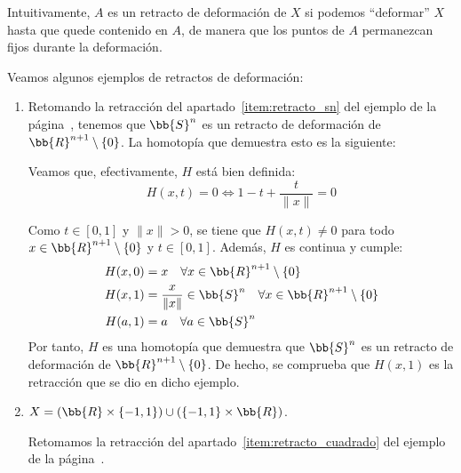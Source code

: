 Intuitivamente, $A$ es un retracto de deformación de $X$ si podemos ``deformar'' $X$ hasta que quede contenido en $A$, de manera que los puntos de $A$ permanezcan fijos durante la deformación.

\begin{ejemplo}\label{ejem:retracto_deformacion} Veamos algunos ejemplos de retractos de deformación:
    \begin{enumerate}
        \item Retomando la retracción del apartado~\ref{item:retracto_sn} del ejemplo de la página~\pageref{ejemplo:retracto}, tenemos que $\bb{S}^n$ es un retracto de deformación de $\bb{R}^{n+1}\setminus\{0\}$. La homotopía que demuestra esto es la siguiente:

        Veamos que, efectivamente, $H$ está bien definida:
        \begin{equation*}
            H(x,t)=0\iff 1-t+\frac{t}{\|x\|} = 0
        \end{equation*}

        Como $t\in [0,1]$ y $\|x\|>0$, se tiene que $H(x,t)\neq 0$ para todo $x\in \bb{R}^{n+1}\setminus\{0\}$ y $t\in [0,1]$. Además, $H$ es continua y cumple:
        \begin{align*}
            H(x,0) &= x \ \ \ \forall x \in \bb{R}^{n+1}\setminus\{0\}\\
            H(x,1) &=  \frac{x}{\|x\|} \in \bb{S}^n \ \ \ \forall x \in \bb{R}^{n+1}\setminus\{0\}\\
            H(a,1) &= a \ \ \ \forall a\in \bb{S}^n
        \end{align*}
        Por tanto, $H$ es una homotopía que demuestra que $\bb{S}^n$ es un retracto de deformación de $\bb{R}^{n+1}\setminus\{0\}$. De hecho, se comprueba que $H(x,1)$ es la retracción que se dio en dicho ejemplo.


        \item $X=(\bb{R}\times \{-1,1\})\cup (\{-1,1\}\times \bb{R})$.
        
        Retomamos la retracción del apartado~\ref{item:retracto_cuadrado} del ejemplo de la página~\pageref{ejemplo:retracto}.      
        \begin{figure}[ht]
            \centering
\end{figure}
\end{enumerate}
\end{ejemplo}
